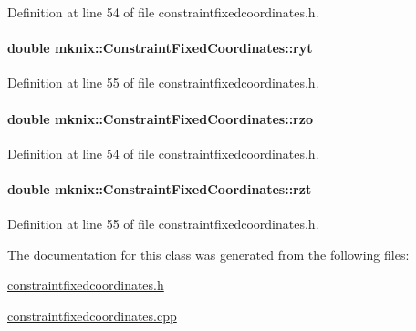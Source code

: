 Definition at line 54 of file constraintfixedcoordinates.\+h.

\hypertarget{classmknix_1_1_constraint_fixed_coordinates_ade68140fb4d4f9e0cb0d2996274e222a}{}
\paragraph[{ryt}]{\setlength{\rightskip}{0pt plus 5cm}double mknix\+::\+Constraint\+Fixed\+Coordinates\+::ryt\hspace{0.3cm}{\ttfamily [protected]}}\label{classmknix_1_1_constraint_fixed_coordinates_ade68140fb4d4f9e0cb0d2996274e222a}


Definition at line 55 of file constraintfixedcoordinates.\+h.

\hypertarget{classmknix_1_1_constraint_fixed_coordinates_a1e43b5f72d8064762f0427204f46b3a1}{}
\paragraph[{rzo}]{\setlength{\rightskip}{0pt plus 5cm}double mknix\+::\+Constraint\+Fixed\+Coordinates\+::rzo\hspace{0.3cm}{\ttfamily [protected]}}\label{classmknix_1_1_constraint_fixed_coordinates_a1e43b5f72d8064762f0427204f46b3a1}


Definition at line 54 of file constraintfixedcoordinates.\+h.

\hypertarget{classmknix_1_1_constraint_fixed_coordinates_a45657121be64f04cf1667a9090ba6451}{}
\paragraph[{rzt}]{\setlength{\rightskip}{0pt plus 5cm}double mknix\+::\+Constraint\+Fixed\+Coordinates\+::rzt\hspace{0.3cm}{\ttfamily [protected]}}\label{classmknix_1_1_constraint_fixed_coordinates_a45657121be64f04cf1667a9090ba6451}


Definition at line 55 of file constraintfixedcoordinates.\+h.



The documentation for this class was generated from the following files\+:\begin{DoxyCompactItemize}
\item 
\hyperlink{constraintfixedcoordinates_8h}{constraintfixedcoordinates.\+h}\item 
\hyperlink{constraintfixedcoordinates_8cpp}{constraintfixedcoordinates.\+cpp}\end{DoxyCompactItemize}
